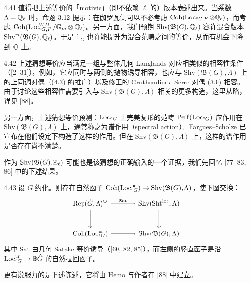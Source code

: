 \begin{rem}{4.41}\label{thm:a2-4-41}
值得把上述等价的「motivic」（即不依赖 $\ell$ 的）版本表述出来。当系数 $\Lambda=\mathbb{Q}_\ell$ 时，命题 3.12 提示：在伽罗瓦侧可以不必考虑 $\operatorname{Coh}(\operatorname{Loc}_{{}^{c}G,F}\otimes\mathbb{Q}_\ell)$，而考虑 $\operatorname{Coh}(\operatorname{Loc}^{WD}_{{}^{c}G,F}/\mathbb G_m\otimes\mathbb{Q}_\ell)$。另一方面，我们预期 $\mathrm{Shv}(\mathfrak B(G),\mathbb{Q}_\ell)$ 容许混合版本 $\mathrm{Shv}^m(\mathfrak B(G),\mathbb{Q}_\ell)$。于是 $\mathbb L_G$ 也许能提升为混合范畴之间的等价，从而有机会下降到 $\mathbb{Q}$ 上。
\end{rem}

\begin{rem}{4.42}\label{thm:a2-4-42}
上述猜想等价应当满足一组与整体几何 Langlands 对应相类似的相容性条件（[2, 31]）。例如，它应同时与两侧的抛物诱导相容，也应与 $\mathrm{Shv}(\mathfrak B(G),\Lambda)$ 上的上同调对偶（(4.3) 的推广）以及修正的 Grothendieck–Serre 对偶 (3.9) 相容。由于讨论这些相容性需要引入与 $\mathrm{Shv}(\mathfrak B(G),\Lambda)$ 相关的更多构造，这里从略，详见 [88]。
\end{rem}

另一方面，上述猜想等价预测：$\operatorname{Loc}_{{}^{c}G}$ 上完美复形的范畴 $\operatorname{Perf}(\operatorname{Loc}_{{}^{c}G})$ 应作用在 $\mathrm{Shv}(\mathfrak B(G),\Lambda)$ 上，通常称之为谱作用（spectral action）。Fargues–Scholze 已宣布在他们设定下构造了这样的作用。但在 $\mathrm{Shv}(\mathfrak B(G),\Lambda)$ 上，这样的谱作用是否存在尚不清楚。

作为 $\mathrm{Shv}(\mathfrak B(G),\mathbb{Z}_\ell)$ 可能也是该猜想的正确输入的一个证据，我们先回忆 [77, 83, 86] 中的下述结果。

\begin{thm}{4.43}\label{thm:a2-4-43}
设 $G$ 约化。则存在自然函子 $\operatorname{Coh}(\operatorname{Loc}^{\mathrm{ur}}_{{}^{c}G})\to\mathrm{Shv}(\mathfrak B(G),\Lambda)$，使下图交换：
\[
\begin{tikzcd}[column sep=large,row sep=large]
\Rep(\hat G,\Lambda)^{\heartsuit} \arrow[r, "\mathrm{Sat}"] \arrow[d] & \mathrm{Shv}(\mathrm{Sht}^{\mathrm{loc}},\Lambda) \arrow[d] \\
\Coh(\Loc^{\mathrm{ur}}_{{}^{c}G}) \arrow[r] & \mathrm{Shv}(\mathfrak B(G),\Lambda)
\end{tikzcd}
\]
其中 $\mathrm{Sat}$ 由几何 Satake 等价诱导（[60, 82, 85]），而左侧的竖直函子是沿 $\operatorname{Loc}^{\mathrm{ur}}_{{}^{c}G}\to\mathbb B\hat G$ 的自然拉回函子。
\end{thm}

更有说服力的是下述陈述，它将由 Hemo 与作者在 [88] 中建立。


